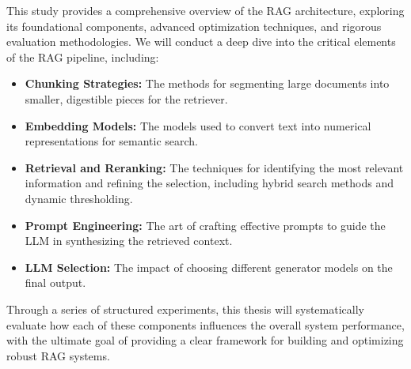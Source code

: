 This study provides a comprehensive overview of the RAG architecture, exploring its foundational components, advanced optimization techniques, and rigorous evaluation methodologies. We will conduct a deep dive into the critical elements of the RAG pipeline, including:
\begin{itemize}
    \item \textbf{Chunking Strategies:} The methods for segmenting large documents into smaller, digestible pieces for the retriever.
    \item \textbf{Embedding Models:} The models used to convert text into numerical representations for semantic search.
    \item \textbf{Retrieval and Reranking:} The techniques for identifying the most relevant information and refining the selection, including hybrid search methods and dynamic thresholding.
    \item \textbf{Prompt Engineering:} The art of crafting effective prompts to guide the LLM in synthesizing the retrieved context.
    \item \textbf{LLM Selection:} The impact of choosing different generator models on the final output.
\end{itemize}

Through a series of structured experiments, this thesis will systematically evaluate how each of these components influences the overall system performance, with the ultimate goal of providing a clear framework for building and optimizing robust RAG systems.